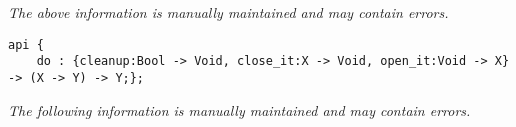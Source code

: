 \label{api:Safely}

{\tiny \it The above information is manually maintained and may contain errors.}
\begin{verbatim}
api {
    do : {cleanup:Bool -> Void, close_it:X -> Void, open_it:Void -> X} -> (X -> Y) -> Y;};
\end{verbatim}
{\tiny \it The following information is manually maintained and may contain errors.}

